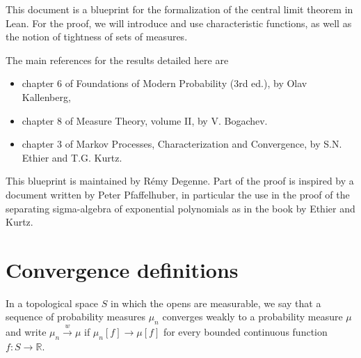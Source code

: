 
This document is a blueprint for the formalization of the central limit theorem in Lean.
For the proof, we will introduce and use characteristic functions, as well as the notion of tightness of sets of measures.

The main references for the results detailed here are
\begin{itemize}
	\item chapter 6 of Foundations of Modern Probability (3rd ed.), by Olav Kallenberg,
	\item chapter 8 of Measure Theory, volume II, by V. Bogachev.
	\item chapter 3 of Markov Processes, Characterization and Convergence, by S.N. Ethier and T.G. Kurtz.
\end{itemize}

This blueprint is maintained by R\'emy Degenne. Part of the proof is inspired by a document written by Peter Pfaffelhuber, in particular the use in the proof of the separating sigma-algebra of exponential polynomials as in the book by Ethier and Kurtz.









\chapter{Convergence definitions}


\begin{definition}\label{def:weak_cvg_measure}
\mathlibok
{}
In a topological space $S$ in which the opens are measurable, we say that a sequence of probability measures $\mu_n$ converges weakly to a probability measure $\mu$ and write $\mu_n \xrightarrow{w} \mu$ if $\mu_n[f] \to \mu[f]$ for every bounded continuous function $f : S \to \mathbb{R}$.
\end{definition}

